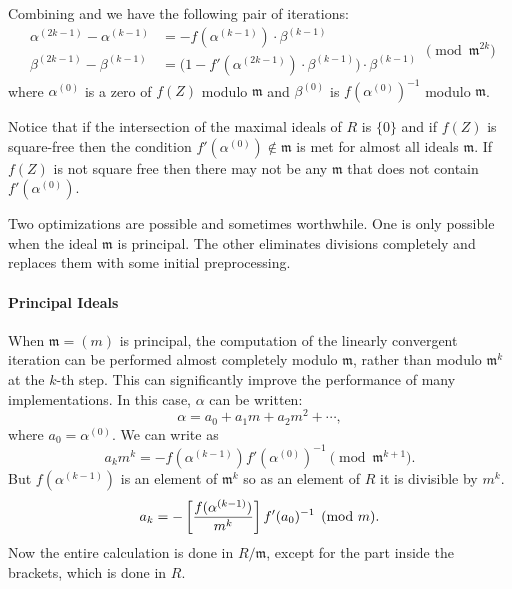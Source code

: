 Combining  and  we have the
following pair of iterations: 
\begin{equation}
\label{Quasi:UNewton:Eq}
\begin{aligned}
  \alpha^{(2k-1)} - \alpha^{(k-1)} &= - f(\alpha^{(k-1)}) \cdot
    \beta^{(k-1)} \\
  \beta^{(2k-1)} - \beta^{(k-1)} & 
     = \bigl(1 - f'(\alpha^{(2k-1)}) \cdot \beta^{(k-1)}\bigr) \cdot
       \beta^{(k-1)}
\end{aligned}
\pmod{\mathfrak{m}^{2k}}
\end{equation}
where $\alpha^{(0)}$ is a zero of $f(Z)$ modulo $\mathfrak{m}$ and
$\beta^{(0)}$ is $f(\alpha^{(0)})^{-1}$ modulo $\mathfrak{m}$.  

Notice that if the intersection of the maximal ideals of $R$ is
$\{0\}$ and if $f(Z)$ is square-free then the condition
$f'(\alpha^{(0)}) \not\in \mathfrak{m}$ is met for almost all ideals
$\mathfrak{m}$.  If $f(Z)$ is not square free then there may not be any
$\mathfrak{m}$ that does not contain $f'(\alpha^{(0)})$.

\medskip
Two optimizations are possible and sometimes worthwhile.  One is only
possible when the ideal $\mathfrak{m}$ is principal.  The other
eliminates divisions completely and replaces them with some initial
preprocessing.

\paragraph{Principal Ideals}

When $\mathfrak{m} = (m)$ is principal, the computation of the
linearly convergent iteration can be performed almost completely
modulo $\mathfrak{m}$, rather than modulo $\mathfrak{m}^{k}$ at the
$k$-th step.  This can significantly improve the performance of many
implementations.  In this case, $\alpha$ can be written:
\[
\alpha = a_0 + a_1 m + a_2 m^2 + \cdots,
\]
where $a_0 = \alpha^{(0)}$.  We can write  as
\[
a_k m^k = -f(\alpha^{(k-1)}) f'(\alpha^{(0)})^{-1} \pmod{\mathfrak{m}^{k+1}}.
\]
But $f(\alpha^{(k-1)})$ is an element of $\mathfrak{m}^k$ so as an element of
$R$ it is divisible by $m^k$.
\begin{equation}
a_k = - \left[{ f(\alpha^{(k-1)}) \over m^k}\right]
f'(a_0)^{-1} \pmod{m}.
\label{EQ:5}
\end{equation}
Now the entire calculation is done in $R/\mathfrak{m}$, except for the part
inside the brackets, which is done in $R$.

